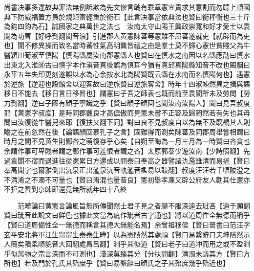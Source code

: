 尚書决事多違故典罪法無例詆欺為先文慘言醜有乖章憲宜責求其意割而勿聼上順國典下防威福置方員於規矩審輕重於衡石【此言决事當依典法也賢曰衡秤衡也三十斤為鈞四鈞為石】誠國家之典萬世之法也　汝南太守山陽王龔政崇寛和好才愛士以袁閬為功曹【好呼到翻閬音浪】引進郡人黄憲陳蕃等憲雖不屈蕃遂就吏【就辟而為吏也】閬不修異操而致名當時蕃性氣高明龔皆禮之由是羣士莫不歸心憲世貧賤父為牛醫穎川荀淑至慎陽【慎陽縣屬汝南郡憲縣人也賢曰在慎水之南因以名縣應劭曰慎水出東北入淮師古曰慎字本作滇音真後誤為慎耳今猶有真邱真陽縣知音不改也闞駰曰永平五年失印更刻遂誤以水為心余按水北為陽賢既云縣在水南而名慎陽何也】遇憲於逆旅【逆迎也設館舍以迎客故曰逆旅賢曰逆旅客舍】時年十四淑竦然異之揖與語移日不能去【移日言日移晷也】謂憲曰子吾之師表也既而前至袁閬所未及勞問【勞力到翻】逆曰子國有顔子寧識之乎【賢曰顔子顔回也閬汝南汝陽人】閬曰見吾叔度耶【黄憲字叔度】是時同郡戴良才高倨傲而見憲未嘗不正容及歸罔然若有失也其母問曰汝復從牛醫兒來耶【復扶又翻下同】對曰良不見叔度自以為無不及既覩其人則瞻之在前忽然在後【論語顔回慕孔子之言】固難得而測矣陳蕃及同郡周舉嘗相謂曰時月之間不見黄生則鄙吝之萌復存乎心矣【自朔至晦為一月三月為一時賢曰吝貪也余謂作事可卑賤者謂之鄙作事可羞恨者謂之吝】太原郭泰少遊汝南【少詩照翻】先過袁閬不宿而退進往從憲累日方還或以問泰曰奉高之器譬諸氿濫雖清而易挹【賢曰奉高閬字也爾雅側出氿泉正出濫泉氿音軌濫音檻易以䜴翻】叔度汪汪若千頃陂澄之不清淆之不濁不可量也【賢曰淆混也量音良】憲初舉孝亷又辟公府友人勸其仕憲亦不拒之暫到京師即還竟無所就年四十八終

　　范曄論曰黄憲言論風旨無所傳聞然士君子見之者靡不服深遠去玼吝【遠于願翻賢曰玼音此說文曰鮮色也據此文當為疵作玼者古字通也】將以道周性全無德而稱乎【賢曰道周備性全一無德而稱言其德大無能名焉】余曾祖穆侯【賢曰晉書曰范汪字玄平安北將軍汪生甯甯生泰泰生曄】以為憲隤然其處順【賢曰易繫辭曰夫坤隤然示人簡矣隤柔順貌音大回翻處昌呂翻】淵乎其似道【賢曰老子曰道冲而用之或不盈淵乎似萬物之宗言深而不可測也】淺深莫臻其分【分扶問翻】清濁未議其方【賢曰方所也】若及門於孔氏其殆庶乎【賢曰易繫辭曰顔氏之子其殆庶幾乎殆近也】

